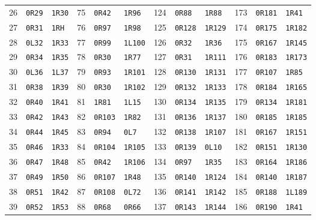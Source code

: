 \begin{center}
\begin{tabular}{@{}rll@{\quad}rll@{\quad}rll@{\quad}rll@{}}
26 & \texttt{0R29} & \texttt{1R30} & 75 & \texttt{0R42} & \texttt{1R96} & 124 & \texttt{0R88} & \texttt{1R88} & 173 & \texttt{0R181} & \texttt{1R41}\\
27 & \texttt{0R31} & \texttt{1RH} & 76 & \texttt{0R97} & \texttt{1R98} & 125 & \texttt{0R128} & \texttt{1R129} & 174 & \texttt{0R175} & \texttt{1R182}\\
28 & \texttt{0L32} & \texttt{1R33} & 77 & \texttt{0R99} & \texttt{1L100} & 126 & \texttt{0R32} & \texttt{1R36} & 175 & \texttt{0R167} & \texttt{1R145}\\
29 & \texttt{0R34} & \texttt{1R35} & 78 & \texttt{0R30} & \texttt{1R77} & 127 & \texttt{0R31} & \texttt{1R111} & 176 & \texttt{0R183} & \texttt{1R173}\\
30 & \texttt{0L36} & \texttt{1L37} & 79 & \texttt{0R93} & \texttt{1R101} & 128 & \texttt{0R130} & \texttt{1R131} & 177 & \texttt{0R107} & \texttt{1R85}\\
31 & \texttt{0R38} & \texttt{1R39} & 80 & \texttt{0R30} & \texttt{1R102} & 129 & \texttt{0R132} & \texttt{1R133} & 178 & \texttt{0R184} & \texttt{1R165}\\
32 & \texttt{0R40} & \texttt{1R41} & 81 & \texttt{1R81} & \texttt{1L15} & 130 & \texttt{0R134} & \texttt{1R135} & 179 & \texttt{0R134} & \texttt{1R181}\\
33 & \texttt{0R42} & \texttt{1R43} & 82 & \texttt{0R103} & \texttt{1R82} & 131 & \texttt{0R136} & \texttt{1R137} & 180 & \texttt{0R185} & \texttt{1R185}\\
34 & \texttt{0R44} & \texttt{1R45} & 83 & \texttt{0R94} & \texttt{0L7} & 132 & \texttt{0R138} & \texttt{1R107} & 181 & \texttt{0R167} & \texttt{1R151}\\
35 & \texttt{0R46} & \texttt{1R33} & 84 & \texttt{0R104} & \texttt{1R105} & 133 & \texttt{0R139} & \texttt{0L10} & 182 & \texttt{0R151} & \texttt{1R130}\\
36 & \texttt{0R47} & \texttt{1R48} & 85 & \texttt{0R42} & \texttt{1R106} & 134 & \texttt{0R97} & \texttt{1R35} & 183 & \texttt{0R164} & \texttt{1R186}\\
37 & \texttt{0R49} & \texttt{1R50} & 86 & \texttt{0R107} & \texttt{1R48} & 135 & \texttt{0R140} & \texttt{1R124} & 184 & \texttt{0R140} & \texttt{1R187}\\
38 & \texttt{0R51} & \texttt{1R42} & 87 & \texttt{0R108} & \texttt{0L72} & 136 & \texttt{0R141} & \texttt{1R142} & 185 & \texttt{0R188} & \texttt{1L189}\\
39 & \texttt{0R52} & \texttt{1R53} & 88 & \texttt{0R68} & \texttt{0R66} & 137 & \texttt{0R143} & \texttt{1R144} & 186 & \texttt{0R190} & \texttt{1R41}\\

\end{tabular}
\end{center}
